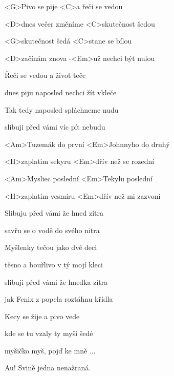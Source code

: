 

\zs
<G>Pivo se pije <C>a řeči se vedou

<D>dnes večer změníme <C>skutečnost šedou
\ks

\zs
<G>skutečnost šedá <C>stane se bílou

<D>začínám znova -<Em>už nechci být nulou
\ks

\zs
Řeči se vedou a život teče

dnes piju naposled nechci žít  vkleče
\ks

\zs
Tak tedy naposled spláchneme nudu

slibuji před vámi víc  pít nebudu
\ks

\zr
<Am>Tuzemák do první <Em>Johnnyho do druhý

<H>zaplatim sekyru <Em>dřív než se rozední

<Am>Mysliec poslední <Em>Tekylu poslední

<H>zaplatím vesmíru <Em>dřív než mi zazvoní
\kr

\zs
Slibuju před vámi že hned zítra

savřu se  o vodě do svého nitra
\ks

\zs
Myšlenky tečou jako dvě deci

těsno a bouřlivo v tý mojí kleci
\ks

\zs
slibuji před vámi že hnedka zítra 

jak Fenix z popela roztáhnu křídla
\ks

\zs
Kecy se žije a pivo vede

kde se tu vzaly ty myši  šedé
\ks

\zr
\kr

\zs
myšičko myš, pojď ke mně ...
\ks

Au! Svině jedna nenažraná.
\kp
